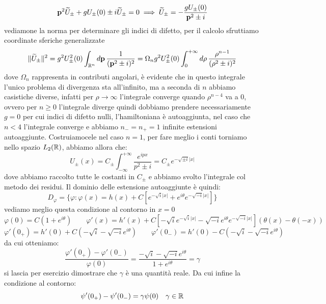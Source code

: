  \[\mathbf{p}^2 \widetilde{U}_\pm + gU_\pm(0) \pm i \widetilde{U}_\pm=0 \implies \widetilde{U}_\pm = -\frac{gU_\pm(0)}{\mathbf{p}^2\pm i}\]
vediamone la norma per determinare gli indici di difetto, per il calcolo sfruttiamo  coordinate sferiche generalizzate
\[\|\widetilde{U}_\pm\|^2 = g^2U_\pm^2(0)\int_{\mathbb{R}^n}d\mathbf{p}\,\frac{1}{(\mathbf{p}^2 \pm i)^2} = \Omega_ng^2U_\pm^2(0) \int_0^{+\infty}d\rho\, \frac{\rho^{n-1}}{(\rho^2\pm i)^2} \]
dove $\Omega_n$ rappresenta in contributi angolari, è evidente che in questo integrale l'unico problema di divergenza sta all'infinito, ma a seconda di $n$ abbiamo casistiche diverse, infatti per $\rho\to \infty$ l'integrale converge quando $\rho^{n-4}$ va a 0, ovvero per $n\geq 0$ l'integrale diverge quindi dobbiamo prendere necessariamente $g=0$ per cui indici di difetto nulli, l'hamiltoniana è autoaggiunta, nel caso che $n<4$ l'integrale converge e abbiamo $n_- = n_+ = 1$ infinite estensioni autoaggiunte. Costruiamocele nel caso $n=1$, per fare meglio i conti torniamo nello spazio $L_2(\mathbb{R})$, abbiamo allora che:
\[U_\pm(x) = C_\pm \int_{-\infty}^{+\infty} \frac{e^{ipx}}{p^2\pm i} = C_\pm e^{-\sqrt{\pm i }|x|}\]
dove abbiamo raccolto tutte le costanti in $C_\pm$ e abbiamo svolto l'integrale col metodo dei residui. Il dominio delle estensione autoaggiunte è quindi:
\[D_\varphi = \{\varphi : \varphi(x) = h(x) +C[e^{-\sqrt{i}|x|} + e^{i\theta}e^{-\sqrt{-i}|x|}]\}\]
vediamo meglio questa condizione al contorno in $x=0$
\[\varphi(0) =C (1+e^{i\theta}) \qquad \varphi'(x) = h'(x) +C[-\sqrt{i}e^{-\sqrt{i}|x|} - \sqrt{-i}e^{i\theta}e^{-\sqrt{-i}|x|}](\theta(x)-\theta(-x))\]
\[\varphi'(0_+) = h'(0) + C(-\sqrt{i}-\sqrt{-i}e^{i\theta}) \qquad \varphi'(0_-) = h'(0) - C(-\sqrt{i}-\sqrt{-i}e^{i\theta})\]
da cui otteniamo:
\[\frac{\varphi'(0_+) -\varphi'(0_-) }{\varphi(0)} = \frac{-\sqrt{i} - \sqrt{-i}e^{i\theta}}{1+e^{i\theta}} = \gamma\]
si lascia per esercizio dimostrare che $\gamma$ è una quantità reale. Da cui infine la condizione al contorno:
\[\psi'(0_+) - \psi'(0_-) = \gamma \psi(0) \quad \gamma\in\mathbb{R}\]


